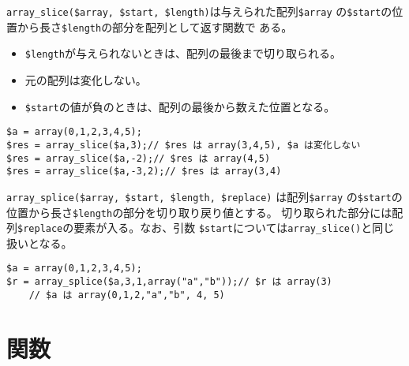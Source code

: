 \Verb+array_slice($array, $start, $length)+は与えられた配列\Verb+$array+
の\Verb+$start+の位置から長さ\Verb+$length+の部分を配列として返す関数で
ある。
\begin{itemize}
 \item \Verb+$length+が与えられないときは、配列の最後まで切り取られる。 
 \item 元の配列は変化しない。
 \item \Verb+$start+の値が負のときは、配列の最後から数えた位置となる。
\end{itemize}
\begin{Verbatim}
$a = array(0,1,2,3,4,5);
$res = array_slice($a,3);// $res は array(3,4,5), $a は変化しない
$res = array_slice($a,-2);// $res は array(4,5)
$res = array_slice($a,-3,2);// $res は array(3,4)
\end{Verbatim}
\Verb+array_splice($array, $start, $length, $replace)+ は配列\Verb+$array+
の\Verb+$start+の位置から長さ\Verb+$length+の部分を切り取り戻り値とする。
切り取られた部分には配列\Verb+$replace+の要素が入る。なお、引数
\Verb+$start+については\Verb+array_slice()+と同じ扱いとなる。
\begin{Verbatim}
$a = array(0,1,2,3,4,5);
$r = array_splice($a,3,1,array("a","b"));// $r は array(3)
	// $a は array(0,1,2,"a","b", 4, 5)
\end{Verbatim}

\iffalse
Interactive shell

print_r($res);
Array
(
    [0] => 3
    [1] => 4
    [2] => 5
)
print_r($a);
Array
(
    [0] => 0
    [1] => 1
    [2] => 2
    [3] => 3
    [4] => 4
    [5] => 5
)
$res = array_slice($a,-2);
print_r($res);
Array
(
    [0] => 4
    [1] => 5
)
$res = array_slice($a,-3,2);
print_r($res);
Array
(
    [0] => 3
    [1] => 4
)

$r = array_splice($a,3,1,array("a","b"));
print_r($r);
Array
(
    [0] => 3
)
print_r($a);
Array
(
    [0] => 0
    [1] => 1
    [2] => 2
    [3] => a
    [4] => b
    [5] => 4
    [6] => 5
)
var_dump($a);
array(7) {
  [0]=>
  int(0)
  [1]=>
  int(1)
  [2]=>
  int(2)
  [3]=>
  string(1) "a"
  [4]=>
  string(1) "b"
  [5]=>
  int(4)
  [6]=>
  int(5)
}
\fi
\section{関数}
